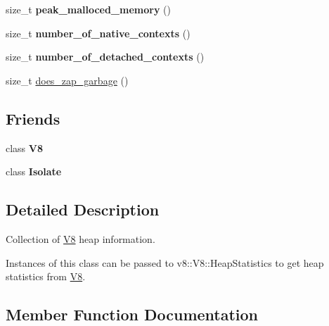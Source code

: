 \begin{DoxyCompactItemize}
size\+\_\+t {\bfseries peak\+\_\+malloced\+\_\+memory} ()
\item 
\mbox{\label{classv8_1_1HeapStatistics_a2f38a3016d9ae43b136141bf5429c4f5}} 
size\+\_\+t {\bfseries number\+\_\+of\+\_\+native\+\_\+contexts} ()
\item 
\mbox{\label{classv8_1_1HeapStatistics_a4e31e1b018bf47c5236c410549908760}} 
size\+\_\+t {\bfseries number\+\_\+of\+\_\+detached\+\_\+contexts} ()
\item 
size\+\_\+t \mbox{\hyperlink{classv8_1_1HeapStatistics_a459f7892a7d56747302e8e9a688debad}{does\+\_\+zap\+\_\+garbage}} ()
\end{DoxyCompactItemize}
\subsection*{Friends}
\begin{DoxyCompactItemize}
\item 
\mbox{\label{classv8_1_1HeapStatistics_a51a1fbf409294cf02a99a020ac94a763}} 
class {\bfseries V8}
\item 
\mbox{\label{classv8_1_1HeapStatistics_aba4f0964bdacf2bbf62cf876e5d28d0a}} 
class {\bfseries Isolate}
\end{DoxyCompactItemize}


\subsection{Detailed Description}
Collection of \mbox{\hyperlink{classv8_1_1V8}{V8}} heap information.

Instances of this class can be passed to v8\+::\+V8\+::\+Heap\+Statistics to get heap statistics from \mbox{\hyperlink{classv8_1_1V8}{V8}}. 

\subsection{Member Function Documentation}
\mbox{\label{classv8_1_1HeapStatistics_a459f7892a7d56747302e8e9a688debad}} 
